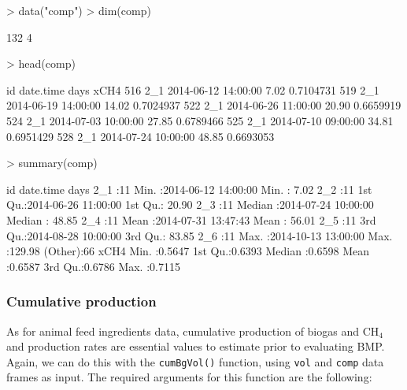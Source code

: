 \documentclass{article}
\begin{document}
\begin{Schunk}
\begin{Sinput}
> data("comp")
> dim(comp)
\end{Sinput}
\begin{Soutput}
[1] 132   4
\end{Soutput}
\begin{Sinput}
> head(comp)
\end{Sinput}
\begin{Soutput}
     id           date.time  days      xCH4
516 2_1 2014-06-12 14:00:00  7.02 0.7104731
519 2_1 2014-06-19 14:00:00 14.02 0.7024937
522 2_1 2014-06-26 11:00:00 20.90 0.6659919
524 2_1 2014-07-03 10:00:00 27.85 0.6789466
525 2_1 2014-07-10 09:00:00 34.81 0.6951429
528 2_1 2014-07-24 10:00:00 48.85 0.6693053
\end{Soutput}
\begin{Sinput}
> summary(comp)
\end{Sinput}
\begin{Soutput}
       id       date.time                        days       
 2_1    :11   Min.   :2014-06-12 14:00:00   Min.   :  7.02  
 2_2    :11   1st Qu.:2014-06-26 11:00:00   1st Qu.: 20.90  
 2_3    :11   Median :2014-07-24 10:00:00   Median : 48.85  
 2_4    :11   Mean   :2014-07-31 13:47:43   Mean   : 56.01  
 2_5    :11   3rd Qu.:2014-08-28 10:00:00   3rd Qu.: 83.85  
 2_6    :11   Max.   :2014-10-13 13:00:00   Max.   :129.98  
 (Other):66                                                 
      xCH4       
 Min.   :0.5647  
 1st Qu.:0.6393  
 Median :0.6598  
 Mean   :0.6587  
 3rd Qu.:0.6786  
 Max.   :0.7115  
\end{Soutput}
\end{Schunk}

\subsubsection*{Cumulative production}
As for animal feed ingredients data, cumulative production of biogas and CH$_4$ and production rates are essential values to estimate prior to evaluating BMP.
Again, we can do this with the \texttt{cumBgVol()} function, using \texttt{vol} and \texttt{comp} data frames as input.
The required arguments for this function are the following:
\end{document}
